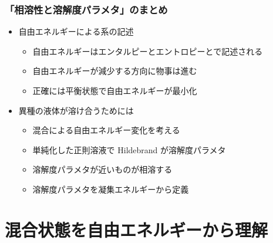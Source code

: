 \documentclass[unicode,12pt]{beamer}%
\begin{document}
\begin{frame}
	\frametitle{「相溶性と溶解度パラメタ」のまとめ}
        \begin{boxnote}
            \vspace{-3mm}
            \begin{itemize}
                \item 自由エネルギーによる系の記述
                    \begin{itemize}
                        \item 自由エネルギーはエンタルピーとエントロピーとで記述される
						\item 自由エネルギーが減少する方向に物事は進む
						\item 正確には平衡状態で自由エネルギーが最小化
                    \end{itemize} 
                \item 異種の液体が溶け合うためには
                    \begin{itemize}
                        \item 混合による自由エネルギー変化を考える
                        \item 単純化した正則溶液で Hildebrand が溶解度パラメタ
                        \item 溶解度パラメタが近いものが相溶する
                        \item 溶解度パラメタを凝集エネルギーから定義
                    \end{itemize} 
            \end{itemize}
        \end{boxnote}
\end{frame}

\section{混合状態を自由エネルギーから理解}
\end{document}
